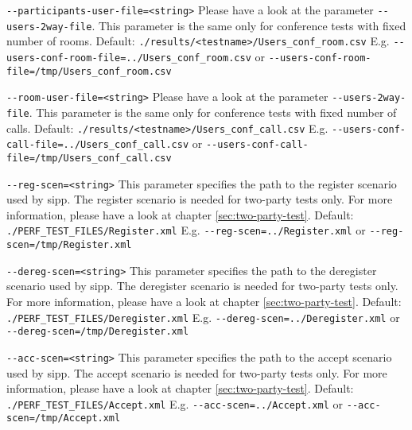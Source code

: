 \begin {description}
\item {\texttt{-{}-participants-user-file=<string>}} \newline
Please have a look at the parameter \texttt{-{}-users-2way-file}.
This parameter is the same only for conference tests with fixed number of rooms.
\newline Default: \texttt{./results/<testname>/Users\_conf\_room.csv}
\newline E.g. \texttt{-{}-users-conf-room-file=../Users\_conf\_room.csv}
\newline or \texttt{-{}-users-conf-room-file=/tmp/Users\_conf\_room.csv}

\item {\texttt{-{}-room-user-file=<string>}} \newline
Please have a look at the parameter \texttt{-{}-users-2way-file}.
This parameter is the same only for conference tests with fixed number of calls.
\newline Default: \texttt{./results/<testname>/Users\_conf\_call.csv}
\newline E.g. \texttt{-{}-users-conf-call-file=../Users\_conf\_call.csv}
\newline or \texttt{-{}-users-conf-call-file=/tmp/Users\_conf\_call.csv}

\item {\texttt{-{}-reg-scen=<string>}} \newline
This parameter specifies the path to the register scenario used by sipp.
The register scenario is needed for two-party tests only.
For more information, please have a look at chapter \ref{sec:two-party-test}.
\newline Default: \texttt{./PERF\_TEST\_FILES/Register.xml}
\newline E.g. \texttt{-{}-reg-scen=../Register.xml} or \texttt{-{}-reg-scen=/tmp/Register.xml}

\item {\texttt{-{}-dereg-scen=<string>}} \newline
This parameter specifies the path to the deregister scenario used by sipp.
The deregister scenario is needed for two-party tests only.
For more information, please have a look at chapter \ref{sec:two-party-test}.
\newline Default: \texttt{./PERF\_TEST\_FILES/Deregister.xml}
\newline E.g. \texttt{-{}-dereg-scen=../Deregister.xml} or \texttt{-{}-dereg-scen=/tmp/Deregister.xml}

\item {\texttt{-{}-acc-scen=<string>}} \newline
This parameter specifies the path to the accept scenario used by sipp.
The accept scenario is needed for two-party tests only.
For more information, please have a look at chapter \ref{sec:two-party-test}.
\newline Default: \texttt{./PERF\_TEST\_FILES/Accept.xml}
\newline E.g. \texttt{-{}-acc-scen=../Accept.xml} or \texttt{-{}-acc-scen=/tmp/Accept.xml}


\end{description}
